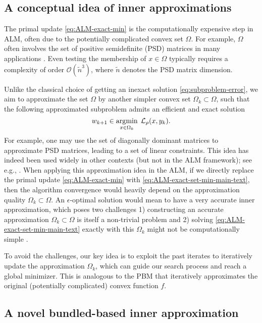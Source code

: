 \documentclass[11pt]{article}
\begin{document}
\subsection{A conceptual idea of inner approximations}
The primal update \cref{eq:ALM-exact-min} is the computationally expensive step in ALM, often due to the potentially complicated convex set $\Omega$. For example, $\Omega$ often involves the set of positive semidefinite (PSD) matrices in many applications \cite{goemans1995improved,lanckriet2004learning}. Even testing the membership of $x \in \Omega$ typically requires a complexity of order $\mathcal{O}(\tilde{n}^3)$, where $\tilde{n}$ denotes the PSD matrix dimension. 

Unlike the classical choice of getting an inexact solution \cref{eq:subproblem-error}, we aim to approximate the set $\Omega$ by another simpler convex set $\Omega_k \subset \Omega$, such that the following approximated subproblem admits an efficient and exact solution
\begin{equation}
\label{eq:ALM-exact-set-min-main-text}
    w_{k+1} \in \operatorname*{\arg\!\min}_{x \in \Omega_{k}}\; \mathcal{L}_{\rho}(x,y_k).
\end{equation}
For example, one may use the set of diagonally dominant matrices to approximate PSD matrices, leading to a set of linear constraints. This idea has indeed been used widely in other contexts (but not in the ALM framework); see e.g., \cite{ahmadi2017sum,zheng2022block,liao2022iterative}. When applying this approximation idea in the ALM, if we directly replace the primal update \cref{eq:ALM-exact-min} with \cref{eq:ALM-exact-set-min-main-text}, then the algorithm convergence would heavily depend on the approximation quality $\Omega_k \subset \Omega$. An $\epsilon$-optimal solution would mean to have a very accurate inner approximation, which poses two challenges 1) constructing an accurate approximation $\Omega_k \subset \Omega$ is itself a non-trivial problem \cite{song2023approximations} and 2) solving \cref{eq:ALM-exact-set-min-main-text} exactly with this $\Omega_k$ might not be computationally simple \cite{zheng2022block}. 

To avoid the challenges, our key idea is to exploit the past iterates to iteratively update the approximation $\Omega_k$, which can guide our search process and reach a global minimizer. This is analogous to the PBM that iteratively approximates the original (potentially complicated) convex function $f$. %

\subsection{A novel bundled-based inner approximation}
\label{subsection:bundle-inner-approximation}
\end{document}
